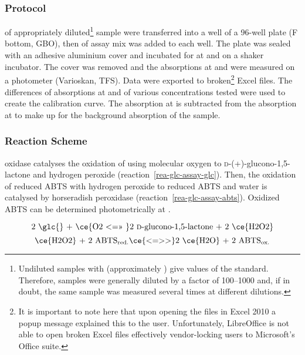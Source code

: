 \subsubsection{Protocol}
 of appropriately diluted\footnote{Undiluted samples with  \glc{} (approximately ) give values of the  standard. Therefore, samples were generally diluted by a factor of \numrange{100}{1000} and, if in doubt, the same sample was measured several times at different dilutions.} sample were transferred into a well of a 96-well plate (F bottom, GBO), then  of assay mix was added to each well. The plate was sealed with an adhesive aluminium cover and incubated for  at  and  on a shaker incubator. The cover was removed and the absorptions at  and  were measured on a photometer (Varioskan, TFS). Data were exported to broken\footnote{It is important to note here that upon opening the files in Excel 2010 a popup message explained this to the user. Unfortunately, LibreOffice is not able to open broken Excel files effectively vendor-locking users to Microsoft's Office suite.} Excel files. The differences of absorptions at  and  of various concentrations tested were used to create the calibration curve. The absorption at  is subtracted from the absorption at  to make up for the background absorption of the sample.

\subsubsection{Reaction Scheme}
\GLC{} oxidase catalyses the oxidation of \glc{} using molecular oxygen to \textsc{d}-(+)-glucono-1,5-lactone and hydrogen peroxide (reaction~\ref{rea-glc-assay-glc}). Then, the oxidation of reduced ABTS with hydrogen peroxide to reduced ABTS and water is catalysed by horseradish peroxidase (reaction~\ref{rea-glc-assay-abts}). Oxidized ABTS can be determined photometrically at .

\begin{equation}
	\label{rea-glc-assay-glc}
	\text{2 \glc{} + \ce{O2 <=>> }2 \textsc{d}-glucono-1,5-lactone + 2 \ce{H2O2}}
\end{equation}
\begin{equation}
	\label{rea-glc-assay-abts}
	\text{\ce{H2O2} + }\text{2 ABTS}_\text{red.} \ce{<=>>} \text{2 \ce{H2O} + }\text{2 ABTS}_\text{ox.}
\end{equation}

